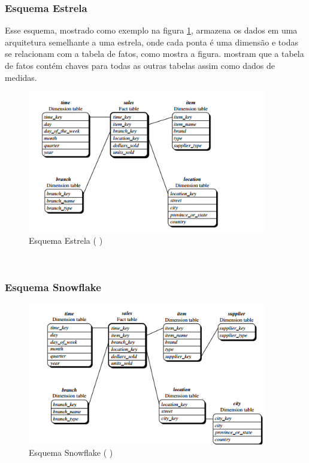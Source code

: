 \subsubsection{Esquema Estrela}
Esse esquema, mostrado como exemplo na figura \ref{star}, armazena os dados em uma arquitetura semelhante a uma estrela, onde cada ponta é uma dimensão e todas se relacionam com a tabela de fatos, como mostra a figura.  mostram que a tabela de fatos contém chaves para todas as outras tabelas assim como dados de medidas.
\begin{figure}[ht]
\centering
\includegraphics[height=6.2cm]{imagens/starscheme.png}
\caption{Esquema Estrela (\citeauthor{jmj} \citeyear{jmj})}
\label{star}
\end{figure}
\\
\subsubsection{Esquema Snowflake}
\begin{figure}[ht]
\centering
\includegraphics[height=6.2cm]{imagens/snowflakescheme.png}
\caption{Esquema Snowflake (\citeauthor{jmj} \citeyear{jmj})}
\label{snowflake}
\end{figure}
